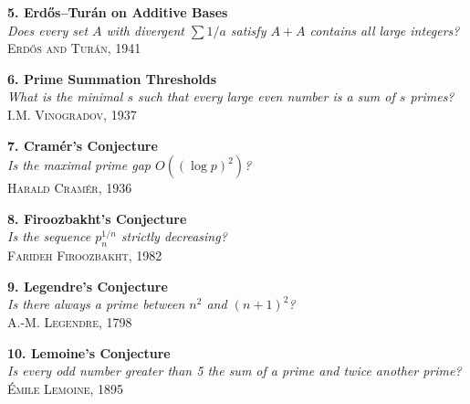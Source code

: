 \begin{center}
\begin{tcolorbox}[
    colback=gray!2,
    colframe=gray!60,
    boxrule=0.4pt,
    width=\textwidth,
    arc=1pt,
    left=6pt,
    right=6pt,
    top=6pt,
    bottom=6pt,
    shadow={0mm}{-0.5mm}{0mm}{gray!40}
  ]
  \noindent\begin{minipage}{0.44\textwidth}
    \textbf{5. Erdős–Turán on Additive Bases}\\
    \emph{Does every set \(A\) with divergent \(\sum 1/a\) satisfy \(A + A\) contains all large integers?}\\
    \hfill\textsc{Erdős and Turán, 1941}
  \end{minipage}\hfill
  \begin{minipage}{0.44\textwidth}
    \textbf{6. Prime Summation Thresholds}\\
    \emph{What is the minimal \(s\) such that every large even number is a sum of \(s\) primes?}\\
    \hfill\textsc{I.M. Vinogradov, 1937}
  \end{minipage}

  \vspace{2em}

  \noindent\begin{minipage}{0.44\textwidth}
    \textbf{7. Cramér's Conjecture}\\
    \emph{Is the maximal prime gap \(O((\log p)^2)\)?}\\
    \hfill\textsc{Harald Cramér, 1936}
  \end{minipage}\hfill
  \begin{minipage}{0.44\textwidth}
    \textbf{8. Firoozbakht's Conjecture}\\
    \emph{Is the sequence \(p_n^{1/n}\) strictly decreasing?}\\
    \hfill\textsc{Farideh Firoozbakht, 1982}
  \end{minipage}

  \vspace{2em}

  \noindent\begin{minipage}{0.44\textwidth}
    \textbf{9. Legendre's Conjecture}\\
    \emph{Is there always a prime between \(n^2\) and \((n+1)^2\)?}\\
    \hfill\textsc{A.-M. Legendre, 1798}
  \end{minipage}\hfill
  \begin{minipage}{0.44\textwidth}
    \textbf{10. Lemoine's Conjecture}\\
    \emph{Is every odd number greater than 5 the sum of a prime and twice another prime?}\\
    \hfill\textsc{Émile Lemoine, 1895}
  \end{minipage}


\end{tcolorbox}
\end{center}
